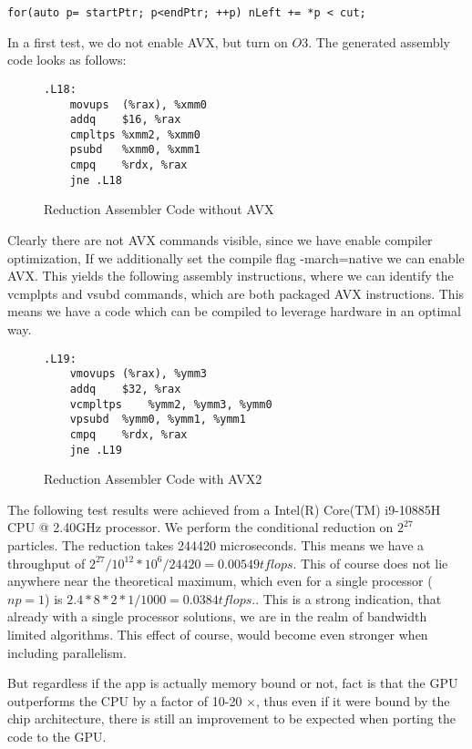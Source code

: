 \documentclass[]{article}
\begin{document}
\begin{lstlisting}
for(auto p= startPtr; p<endPtr; ++p) nLeft += *p < cut;
\end{lstlisting}

In a first test, we do not enable AVX, but turn on $O3$. The generated assembly code looks as follows:

\begin{figure}
	\begin{lstlisting}
.L18:
	movups	(%rax), %xmm0
	addq	$16, %rax
	cmpltps	%xmm2, %xmm0
	psubd	%xmm0, %xmm1
	cmpq	%rdx, %rax
	jne	.L18

	\end{lstlisting}
\caption{Reduction Assembler Code without AVX}
\label{fig:assembler}
\end{figure}
Clearly there are not AVX commands visible, since we have enable compiler optimization, 
If we additionally set the compile flag -march=native we can enable AVX. This yields the following assembly instructions, where we can identify the vcmplpts and vsubd commands, which are both packaged AVX instructions. This means we have a code which can be compiled to leverage hardware in an optimal way.

\begin{figure}
\begin{lstlisting}
.L19:
	vmovups	(%rax), %ymm3
	addq	$32, %rax
	vcmpltps	%ymm2, %ymm3, %ymm0
	vpsubd	%ymm0, %ymm1, %ymm1
	cmpq	%rdx, %rax
	jne	.L19	

\end{lstlisting}
\caption{Reduction Assembler Code with AVX2}
\label{fig:assembler-avx}
\end{figure}

The following test results were achieved from a Intel(R) Core(TM) i9-10885H CPU @ 2.40GHz
processor. We perform the conditional reduction on  $2^{27}$ particles. The reduction takes 244420 microseconds. This means we have a throughput of $2^{27} / 10^{12} * 10^6 / 24420 = 0.00549 tflops$. This of course does not lie anywhere near the theoretical maximum, which even for a single processor ($np = 1$) is $2.4 * 8 * 2 * 1 / 1000 = 0.0384 tflops.$. This is a strong indication, that already with a single processor solutions, we are in the realm of bandwidth limited algorithms. This effect of course, would become even stronger when including parallelism.

But regardless if the app is actually memory bound or not, fact is that the GPU outperforms the CPU by a factor of 10-20 $\times$, thus even if it were bound by the chip architecture, there is still an improvement to be expected when porting the code to the GPU. 
\end{document}
